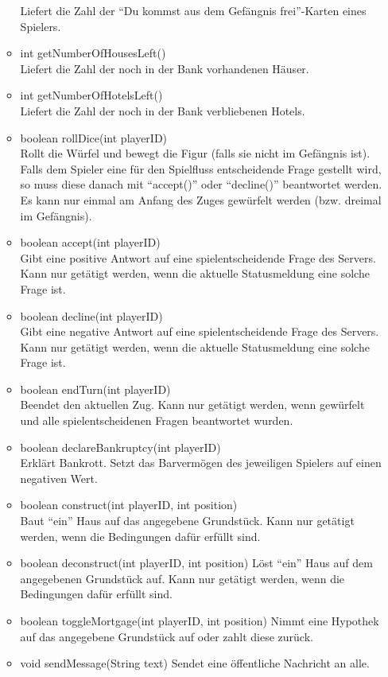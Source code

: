 \documentclass[a4paper,10pt]{article}
\begin{document}
\begin{itemize}
\begin{itemize}
Liefert die Zahl der "`Du kommst aus dem Gefängnis frei"'-Karten eines Spielers.
\item int getNumberOfHousesLeft() \\
Liefert die Zahl der noch in der Bank vorhandenen Häuser.
\item int getNumberOfHotelsLeft() \\
Liefert die Zahl der noch in der Bank verbliebenen Hotels.
\item boolean rollDice(int playerID) \\
Rollt die Würfel und bewegt die Figur (falls sie nicht im Gefängnis ist).
Falls dem Spieler eine für den Spielfluss entscheidende Frage gestellt wird, so muss diese
danach mit "`accept()"' oder "`decline()"' beantwortet
werden. Es kann nur einmal am Anfang des Zuges gewürfelt werden (bzw. dreimal im Gefängnis).
\item boolean accept(int playerID) \\
Gibt eine positive Antwort auf eine spielentscheidende Frage des Servers.
Kann nur getätigt werden, wenn die aktuelle Statusmeldung eine solche
Frage ist.
\item boolean decline(int playerID) \\
Gibt eine negative Antwort auf eine spielentscheidende Frage des Servers.
Kann nur getätigt werden, wenn die aktuelle Statusmeldung eine solche
Frage ist.
\item boolean endTurn(int playerID) \\
Beendet den aktuellen Zug. Kann nur getätigt werden, wenn gewürfelt und
alle spielentscheidenen Fragen beantwortet wurden.
\item boolean declareBankruptcy(int playerID) \\
Erklärt Bankrott. Setzt das Barvermögen des jeweiligen Spielers auf einen negativen Wert.
\item boolean construct(int playerID, int position) \\
Baut "`ein"' Haus auf das angegebene Grundstück. Kann nur getätigt
werden, wenn die Bedingungen dafür erfüllt sind.
\item boolean deconstruct(int playerID, int position)
Löst "`ein"' Haus auf dem angegebenen Grundstück auf. Kann nur
getätigt werden, wenn die Bedingungen dafür erfüllt sind.
\item boolean toggleMortgage(int playerID, int position)
Nimmt eine Hypothek auf das angegebene Grundstück auf oder zahlt diese
zurück.
\item void sendMessage(String text)
Sendet eine öffentliche Nachricht an alle.

\end{itemize}
\end{itemize}
\end{document}
